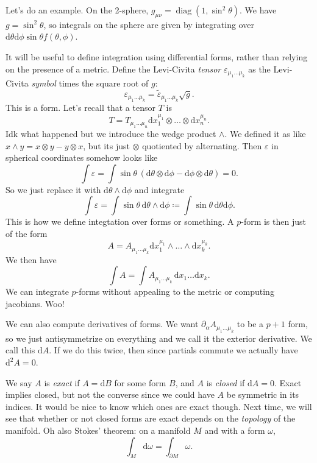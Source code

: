 Let's do an example. On the 2-sphere, $g_{\mu \nu } =\operatorname{diag} (1,\sin ^2\theta )$. We have $g=\sin ^2\theta $, so integrals on the sphere are given by integrating over $\mathrm{d} \theta \mathrm{d} \phi \sin \theta f(\theta ,\phi )$.

It will be useful to define integration using differential forms, rather than relying on the presence of a metric. Define the Levi-Civita \emph{tensor} $\varepsilon_{\mu _1 \ldots \mu _k} $ as the Levi-Civita \emph{symbol} times the square root of $g$:
\[
	\varepsilon _{\mu _1\ldots \mu _k} =\widetilde{\varepsilon }_{\mu _1\ldots \mu _k} \sqrt{g} 
.\]
This is a form. Let's recall that a tensor $T$ is
\[
	T=T_{\mu _1 \ldots \mu _n} \mathrm{d} x_1^{\mu _1}  \otimes \ldots \otimes \mathrm{d} x_n^{\mu _n} 
.\]
Idk what happened but we introduce the wedge product $\wedge $. We defined it as like $x\wedge y=x\otimes y-y\otimes x$, but its just $\otimes $ quotiented by alternating. Then $\varepsilon $ in spherical coordinates somehow looks like
\[
	\int \varepsilon =\int \sin \theta  \,(\mathrm{d} \theta \otimes \mathrm{d} \phi -\mathrm{d} \phi\otimes  \mathrm{d} \theta) =0
.\]
So we just replace it with $\mathrm{d} \theta \wedge \mathrm{d} \phi $ and integrate
\[
	\int \varepsilon =\int \sin \theta  \,\mathrm{d} \theta \wedge \mathrm{d} \phi \coloneqq \int \sin \theta  \,\mathrm{d} \theta \mathrm{d}\phi 
.\]
This is how we define integtation over forms or something. A $p$-form is then just of the form
\[
	A=A_{\mu _1\ldots \mu _k} \mathrm{d} x_1^{\mu _1} \wedge\ldots \wedge  \mathrm{d} x_k^{\mu _k} 
.\]
We then have
\[
	\int A =\int A_{\mu _1\ldots \mu _k}  \,\mathrm{d} x_1\ldots \mathrm{d} x_k
.\]
We can integrate $p$-forms without appealing to the metric or computing jacobians. Woo!

We can also compute derivatives of forms. We want $\partial _\alpha A_{\mu _1\ldots \mu _k} $ to be a $p+1$ form, so we just antisymmetrize on everything and we call it the exterior derivative. We call this $\mathrm{d} A$. If we do this twice, then since partials commute we actually have $\mathrm{d} ^2A=0$.

We say $A$ is \emph{exact} if $A=\mathrm{d} B$ for some form $B$, and $A$ is \emph{closed} if $\mathrm{d} A=0$. Exact implies closed, but not the converse since we could have $A$ be symmetric in its indices. It would be nice to know which ones are exact though. Next time, we will see that whether or not closed forms are exact depends on the \emph{topology} of the manifold. Oh also Stokes' theorem: on a manifold $M$ and with a form $\omega $,
\[
	\int_M \mathrm{d} \omega =\int_{\partial M} \omega 
.\]

